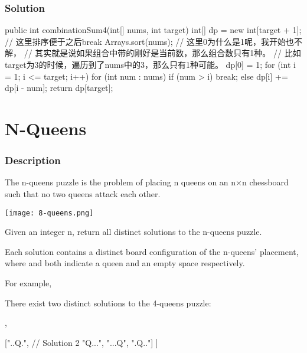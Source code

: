 \subsubsection{Solution}

\begin{Code}
public int combinationSum4(int[] nums, int target) {
    int[] dp = new int[target + 1];
    // 这里排序便于之后break
    Arrays.sort(nums);
    // 这里0为什么是1呢，我开始也不解，
    // 其实就是说如果组合中带的刚好是当前数，那么组合数只有1种。
    // 比如target为3的时候，遍历到了nums中的3，那么只有1种可能。
    dp[0] = 1;
    for (int i = 1; i <= target; i++) {
        for (int num : nums) {
            if (num > i) {
                break;
            } else {
                dp[i] += dp[i - num];
            }
        }
    }
    return dp[target];
}
\end{Code}

\newpage

\section{N-Queens} %

\subsubsection{Description}
The n-queens puzzle is the problem of placing n queens on an n×n chessboard such that no two queens attack each other.

\begin{center}
\texttt{[image: 8-queens.png]}\\
\end{center}

Given an integer n, return all distinct solutions to the n-queens puzzle.

Each solution contains a distinct board configuration of the n-queens' placement, where  and  both indicate a queen and an empty space respectively.

For example,

There exist two distinct solutions to the 4-queens puzzle:

\begin{Code}
[
 [".Q..",  // Solution 1
  "...Q",
  "Q...",
  "..Q."],

 ["..Q.",  // Solution 2
  "Q...",
  "...Q",
  ".Q.."]
]
\end{Code}

\newpage

